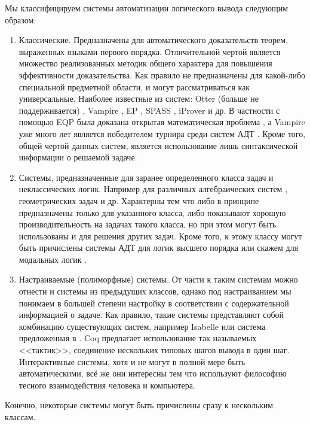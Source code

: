 Мы классифицируем системы автоматизации логического вывода следующим образом:
\begin{enumerate}
\item Классические. Предназначены для автоматического доказательств теорем, выраженных языками первого порядка. Отличительной чертой является множество реализованных методик общего характера для повышения эффективности доказательства. Как правило не предназначены для какой-либо специальной предметной области, и могут рассматриваться как универсальные. Наиболее известные из систем: Otter (больше не поддерживается) \cite{otter}, Vampire \cite{vprover}, EP \cite{eprover}, SPASS \cite{SPASS}, iProver \cite{iprover} и др.  В частности  с помощью EQP \cite{EQP} была доказана открытая математическая проблема \cite{McCuneRob}, а Vampire уже много лет является победителем турнира среди систем АДТ \cite{CASC}. Кроме того, общей чертой данных систем, является использование лишь синтаксической информации о решаемой задаче.

\item Системы, предназначенные для заранее определенного класса задач и неклассических логик. Например для различных алгебраических систем \cite{tptp}, геометрических задач \cite{ATP_geometry, tptp} и др. Характерны тем что либо в принципе предназначены только для указанного класса, либо показывают хорошую производительность на задачах такого класса, но при этом могут быть использованы и для решения других задач. Кроме того, к этому классу могут быть причислены системы АДТ для логик высшего порядка \cite{HOLprover} или скажем для модальных логик \cite{ModalProver}.

\item Настраиваемые (полиморфные) системы. От части к таким системам можно отнести и системы из предыдущих классов, однако под настраиванием мы понимаем в большей степени настройку в соответствии с содержательной информацией о задаче. Как правило, такие системы представляют собой комбинацию существующих систем, например Isabelle \cite{Isabelle} или система предложенная в \cite{ProblemOrientedATP1}. Coq \cite{LaCoq} предлагает использование так называемых <<тактик>>, соединение нескольких типовых шагов вывода в один шаг. Интерактивные системы, хотя и не могут в полной мере быть автоматическими, всё же они интересны тем что используют философию тесного взаимодействия человека и компьютера.
\end{enumerate}
Конечно, некоторые системы могут быть причислены сразу к нескольким классам.


